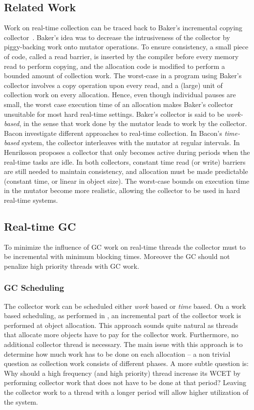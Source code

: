 \subsection{Related Work}

Work on real-time collection can be traced back to Baker's
incremental copying collector~\cite{gc:baker78}.  Baker's idea was
to decrease the intrusiveness of the collector by piggy-backing work
onto mutator operations.  To ensure consistency, a small piece of
code, called a read barrier, is inserted by the compiler before
every memory read to perform copying, and the allocation code is
modified to perform a bounded amount of collection work.  The
worst-case in a program using Baker's collector involves a copy
operation upon every read, and a (large) unit of collection work on
every allocation.  Hence, even though individual pauses are small,
the worst case execution time of an allocation makes Baker's
collector unsuitable for most hard real-time settings.  Baker's
collector is said to be \emph{work-based}, in the sense that work
done by the mutator leads to work by the collector.  Bacon \ea
\cite{Bacon03} investigate different approaches to real-time
collection.  In Bacon's \emph{time-based} system, the collector
interleaves with the mutator at regular intervals.
In~\cite{Henriksson} Henriksson proposes a collector that only
becomes active during periods when the real-time tasks are idle.  In
both collectors, constant time read (or write) barriers are still
needed to maintain consistency, and allocation must be made
predictable (constant time, or linear in object size).  The
worst-case bounds on execution time in the mutator become more
realistic, allowing the collector to be used in hard real-time
systems.

\subsection{Real-time GC}

To minimize the influence of GC work on real-time threads the collector must
to be incremental with minimum blocking times. Moreover the GC should not
penalize high priority threads with GC work.

\subsubsection{GC Scheduling}

The collector work can be scheduled either \emph{work} based or
\emph{time} based. On a work based scheduling, as performed in
\cite{gc:siebert:phd}, an incremental part of the collector work is
performed at object allocation. This approach sounds quite natural
as threads that allocate more objects have to pay for the collector
work. Furthermore, no additional collector thread is necessary. The
main issue with this approach is to determine how much work has to
be done on each allocation -- a non trivial question as collection
work consists of different phases. A more subtle question is: Why
should a high frequency (and high priority) thread increase its WCET
by performing collector work that does not have to be done at that
period? Leaving the collector work to a thread with a longer period
will allow higher utilization of the system.

